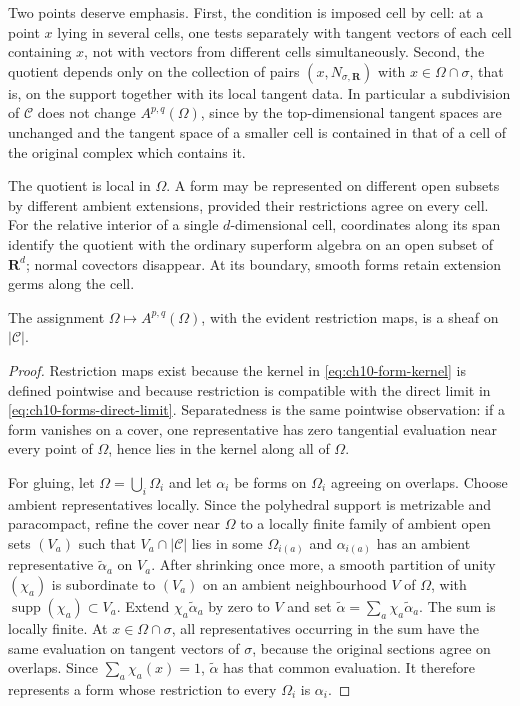 Two points deserve emphasis.  First, the condition is imposed cell by cell:
at a point
$x$ lying in several cells, one tests separately with tangent vectors of each
cell containing $x$, not with vectors from different cells simultaneously.
Second, the quotient depends only on the collection of pairs
$(x,N_{\sigma,\mathbf R})$ with $x\in\Omega\cap\sigma$, that is, on the
support together with its local tangent data.  In particular a subdivision of
$\mathscr C$ does not change $A^{p,q}(\Omega)$, since by
 the top-dimensional tangent spaces are
unchanged and the tangent space of a smaller cell is contained in that of a
cell of the original complex which contains it.

The quotient is local in $\Omega$.  A form may be represented on different
open subsets by different ambient extensions, provided their restrictions
agree on every cell. For the relative interior of a single $d$-dimensional
cell, coordinates along its span identify the quotient with the ordinary
superform algebra on an open subset of $\mathbf R^d$; normal covectors
disappear. At its boundary, smooth forms retain extension germs along the cell.

\begin{lemma}
\label{lem:ch10-forms-sheaf}
The assignment $\Omega\mapsto A^{p,q}(\Omega)$, with the evident restriction
maps, is a sheaf on $|\mathscr C|$.
\end{lemma}

\begin{proof}
Restriction maps exist because the kernel in
\eqref{eq:ch10-form-kernel} is defined pointwise and because restriction is
compatible with the direct limit in \eqref{eq:ch10-forms-direct-limit}.
Separatedness is the same pointwise observation: if a form vanishes on a
cover, one representative has zero tangential evaluation near every point of
$\Omega$, hence lies in the kernel along all of $\Omega$.

For gluing, let $\Omega=\bigcup_i\Omega_i$ and let $\alpha_i$ be forms on
$\Omega_i$ agreeing on overlaps.  Choose ambient representatives locally.
Since the polyhedral support is metrizable and paracompact, refine the cover
near $\Omega$ to a locally finite family of ambient open sets $(V_a)$ such
that $V_a\cap|\mathscr C|$ lies in some $\Omega_{i(a)}$ and
$\alpha_{i(a)}$ has an ambient representative
$\widetilde\alpha_a$ on $V_a$.  After shrinking once more, a smooth
partition of unity $(\chi_a)$ is subordinate to $(V_a)$ on an ambient
neighbourhood $V$ of $\Omega$, with $\operatorname{supp}(\chi_a)\subset
V_a$.  Extend $\chi_a\widetilde\alpha_a$ by zero to $V$ and set
$\widetilde\alpha=\sum_a\chi_a\widetilde\alpha_a$.  The sum is locally
finite.  At $x\in\Omega\cap\sigma$, all representatives occurring in the
sum have the same evaluation on tangent vectors of $\sigma$, because the
original sections agree on overlaps.  Since $\sum_a\chi_a(x)=1$,
$\widetilde\alpha$ has that common evaluation.  It therefore represents a
form whose restriction to every $\Omega_i$ is $\alpha_i$.
\end{proof}

